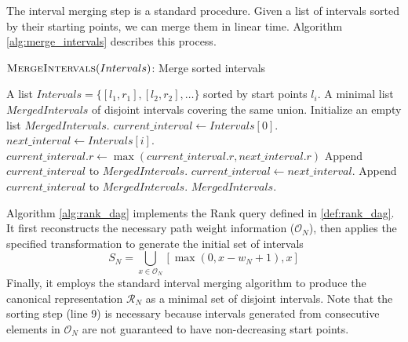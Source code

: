 The interval merging step is a standard procedure. Given a list of intervals sorted by their starting points, we can merge them in linear time. Algorithm \ref{alg:merge_intervals} describes this process.
\begin{algorithm}[htbp]
    \caption{$\textsc{MergeIntervals}(Intervals)$: Merge sorted intervals}
    \label{alg:merge_intervals}
    \small
    \begin{algorithmic}[1]
        \Require A list $Intervals = \{[l_1, r_1], [l_2, r_2], \dots\}$ sorted by start points $l_i$.
        \Ensure A minimal list $MergedIntervals$ of disjoint intervals covering the same union.
        \State Initialize an empty list $MergedIntervals$.
        \State $current\_interval \gets Intervals[0]$.
        \State $next\_interval \gets Intervals[i]$.
        \State $current\_interval.r \gets \max(current\_interval.r, next\_interval.r)$
        \Else
        \State Append $current\_interval$ to $MergedIntervals$.
        \State $current\_interval \gets next\_interval$.
        \EndIf
        \EndFor
        \State Append $current\_interval$ to $MergedIntervals$.
        \EndIf
        \State \Return $MergedIntervals$.
    \end{algorithmic}
\end{algorithm}


Algorithm \ref{alg:rank_dag} implements the Rank query defined in \ref{def:rank_dag}. It first reconstructs the necessary path weight information ($\mathcal{O}_N$), then applies the specified transformation to generate the initial set of intervals
\[S_N = \bigcup_{x \in \mathcal{O}_N} [ \max(0, x - w_N + 1), x ]\]
Finally, it employs the standard interval merging algorithm to produce the canonical representation $\mathcal{R}_N$ as a minimal set of disjoint intervals. Note that the sorting step (line 9) is necessary because intervals generated from consecutive elements in $\mathcal{O}_N$ are not guaranteed to have non-decreasing start points.


